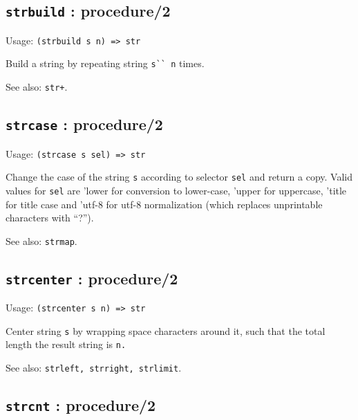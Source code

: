 \documentclass[
]{article}
\newcommand{\passthrough}[1]{#1}
\begin{document}
\hypertarget{strbuild-procedure2-1}{%
\subsection{\texorpdfstring{\texttt{strbuild} :
procedure/2}{strbuild : procedure/2}}\label{strbuild-procedure2-1}}

Usage: \passthrough{\lstinline!(strbuild s n) => str!}

Build a string by repeating string \passthrough{\lstinline!s`` n!}
times.

See also: \passthrough{\lstinline!str+!}.

\hypertarget{strcase-procedure2-1}{%
\subsection{\texorpdfstring{\texttt{strcase} :
procedure/2}{strcase : procedure/2}}\label{strcase-procedure2-1}}

Usage: \passthrough{\lstinline!(strcase s sel) => str!}

Change the case of the string \passthrough{\lstinline!s!} according to
selector \passthrough{\lstinline!sel!} and return a copy. Valid values
for \passthrough{\lstinline!sel!} are 'lower for conversion to
lower-case, 'upper for uppercase, 'title for title case and 'utf-8 for
utf-8 normalization (which replaces unprintable characters with ``?'').

See also: \passthrough{\lstinline!strmap!}.

\hypertarget{strcenter-procedure2-1}{%
\subsection{\texorpdfstring{\texttt{strcenter} :
procedure/2}{strcenter : procedure/2}}\label{strcenter-procedure2-1}}

Usage: \passthrough{\lstinline!(strcenter s n) => str!}

Center string \passthrough{\lstinline!s!} by wrapping space characters
around it, such that the total length the result string is
\passthrough{\lstinline!n.!}

See also: \passthrough{\lstinline!strleft, strright, strlimit!}.

\hypertarget{strcnt-procedure2-1}{%
\subsection{\texorpdfstring{\texttt{strcnt} :
procedure/2}{strcnt : procedure/2}}\label{strcnt-procedure2-1}}
\end{document}

